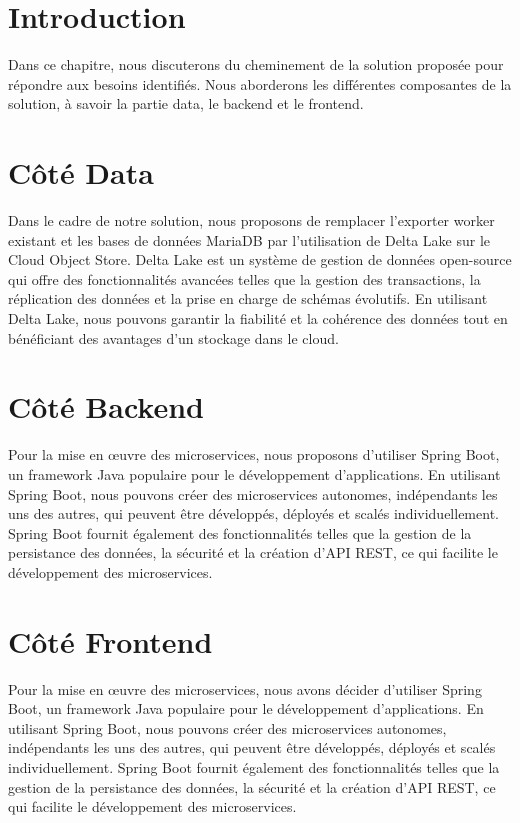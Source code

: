 \section*{Introduction}

Dans ce chapitre, nous discuterons du cheminement de la solution proposée pour répondre aux besoins identifiés. Nous aborderons les différentes composantes de la solution, à savoir la partie data, le backend et le frontend.


\section{Côté Data}
Dans le cadre de notre solution, nous proposons de remplacer l'exporter worker existant et les bases de données MariaDB par l'utilisation de Delta Lake sur le Cloud Object Store. Delta Lake est un système de gestion de données open-source qui offre des fonctionnalités avancées telles que la gestion des transactions, la réplication des données et la prise en charge de schémas évolutifs. En utilisant Delta Lake, nous pouvons garantir la fiabilité et la cohérence des données tout en bénéficiant des avantages d'un stockage dans le cloud.

\section{Côté Backend}
Pour la mise en œuvre des microservices, nous proposons d'utiliser Spring Boot, un framework Java populaire pour le développement d'applications. En utilisant Spring Boot, nous pouvons créer des microservices autonomes, indépendants les uns des autres, qui peuvent être développés, déployés et scalés individuellement. Spring Boot fournit également des fonctionnalités telles que la gestion de la persistance des données, la sécurité et la création d'API REST, ce qui facilite le développement des microservices.

\section{Côté Frontend}
Pour la mise en œuvre des microservices, nous avons décider d'utiliser Spring Boot, un framework Java populaire pour le développement d'applications. En utilisant Spring Boot, nous pouvons créer des microservices autonomes, indépendants les uns des autres, qui peuvent être développés, déployés et scalés individuellement. Spring Boot fournit également des fonctionnalités telles que la gestion de la persistance des données, la sécurité et la création d'API REST, ce qui facilite le développement des microservices.

